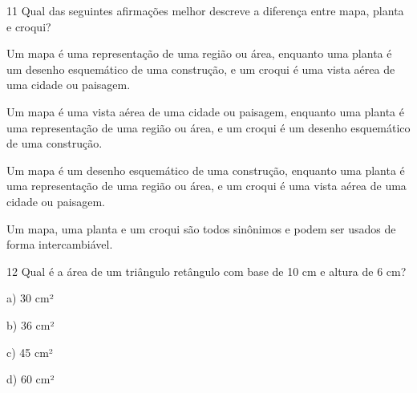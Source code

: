 \num{11} Qual das seguintes afirmações melhor descreve a diferença entre
mapa, planta e croqui?

\item
  Um mapa é uma representação de uma região ou área, enquanto uma planta
  é um desenho esquemático de uma construção, e um croqui é uma vista
  aérea de uma cidade ou paisagem.
\item
  Um mapa é uma vista aérea de uma cidade ou paisagem, enquanto uma
  planta é uma representação de uma região ou área, e um croqui é um
  desenho esquemático de uma construção.
\item
  Um mapa é um desenho esquemático de uma construção, enquanto uma
  planta é uma representação de uma região ou área, e um croqui é uma
  vista aérea de uma cidade ou paisagem.
\item
  Um mapa, uma planta e um croqui são todos sinônimos e podem ser usados
  de forma intercambiável.



\num{12} Qual é a área de um triângulo retângulo com base de 10 cm e altura
de 6 cm?

a) 30 cm²

b) 36 cm²

c) 45 cm²

d) 60 cm²



